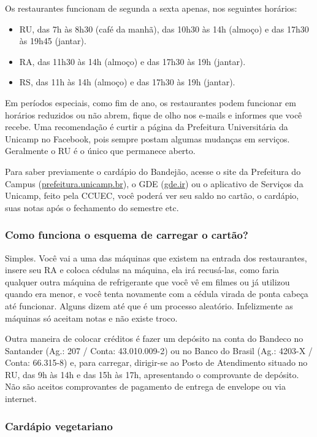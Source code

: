 Os restaurantes funcionam de segunda a sexta apenas, nos seguintes horários:

\begin{itemize}
\item RU, das 7h às 8h30 (café da manhã), das 10h30 às 14h (almoço) e das 17h30
  às 19h45 (jantar).
\item RA, das 11h30 às 14h (almoço) e das 17h30 às 19h (jantar).
\item RS, das 11h às 14h (almoço) e das 17h30 às 19h (jantar).
\end{itemize}

Em períodos especiais, como fim de ano, os restaurantes podem funcionar em
horários reduzidos ou não abrem, fique de olho nos e-mails e informes que você
recebe. Uma recomendação é curtir a página da Prefeitura Universitária da
Unicamp no Facebook, pois sempre postam algumas mudanças em serviços.
Geralmente o RU é o único que permanece aberto.

Para saber previamente o cardápio do Bandejão, acesse o site da Prefeitura do
Campus (\url{prefeitura.unicamp.br}), o GDE (\url{gde.ir}) ou o aplicativo de
Serviços da Unicamp, feito pela CCUEC, você poderá ver seu saldo no cartão, o
cardápio, suas notas após o fechamento do semestre etc.

\subsubsection{Como funciona o esquema de carregar o cartão?}

Simples. Você vai a uma das máquinas que existem na entrada dos restaurantes,
insere seu RA e coloca cédulas na máquina, ela irá recusá-las, como faria
qualquer outra máquina de refrigerante que você vê em filmes ou já utilizou
quando era menor, e você tenta novamente com a cédula virada de ponta cabeça
até funcionar. Alguns dizem até que é um processo aleatório. Infelizmente as
máquinas só aceitam notas e não existe troco.

Outra maneira de colocar créditos é fazer um depósito na conta do Bandeco no
Santander (Ag.: 207 / Conta: 43.010.009-2) ou no Banco do Brasil (Ag.: 4203-X /
Conta: 66.315-8) e, para carregar, dirigir-se ao Posto de Atendimento situado
no RU, das 9h às 14h e das 15h às 17h, apresentando o comprovante de depósito.
Não são aceitos comprovantes de pagamento de entrega de envelope ou via
internet.

\subsubsection{Cardápio vegetariano}

